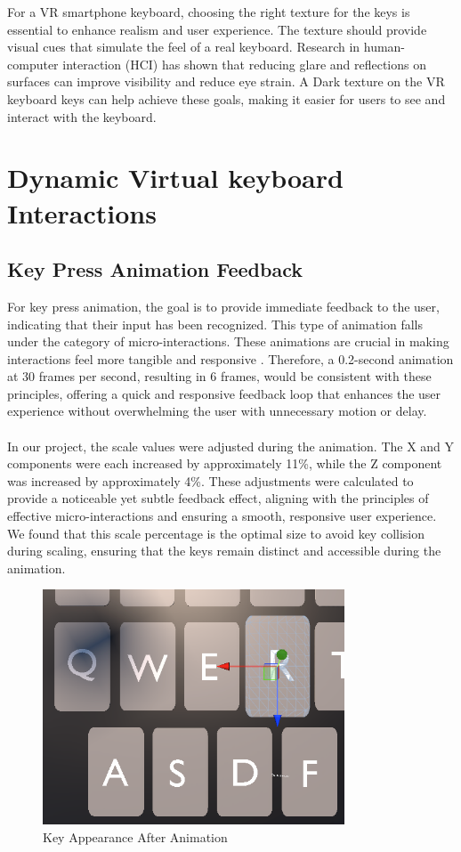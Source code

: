For a \ac{VR} smartphone keyboard, choosing the right texture for the keys is essential to enhance realism and user experience. The texture should provide visual cues that simulate the feel of a real keyboard. Research in human-computer interaction (HCI) \cite{Fitts2004} has shown that reducing glare and reflections on surfaces can improve visibility and reduce eye strain. A Dark texture on the \ac{VR} keyboard keys can help achieve these goals, making it easier for users to see and interact with the keyboard.

\section{Dynamic Virtual keyboard Interactions}

\subsection{Key Press Animation Feedback}
For key press animation, the goal is to provide immediate feedback to the user, indicating that their input has been recognized. This type of animation falls under the category of micro-interactions. These animations are crucial in making interactions feel more tangible and responsive \cite{Hannah2021}. Therefore, a 0.2-second animation at 30 frames per second, resulting in 6 frames, would be consistent with these principles, offering a quick and responsive feedback loop that enhances the user experience without overwhelming the user with unnecessary motion or delay.\\ \\
In our project, the scale values were adjusted during the animation. The X and Y components were each increased by approximately 11\%, while the Z component was increased by approximately 4\%. These adjustments were calculated to provide a noticeable yet subtle feedback effect, aligning with the principles of effective micro-interactions and ensuring a smooth, responsive user experience. We found that this scale percentage is the optimal size to avoid key collision during scaling, ensuring that the keys remain distinct and accessible during the animation. 
 \begin{figure}[h!]
\centering
\includegraphics[width=0.8\textwidth]{Development/key_AfterAnimation.PNG} 
\caption{Key Appearance After Animation}
\end{figure}

